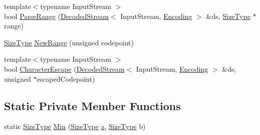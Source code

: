\begin{DoxyCompactItemize}
\item 
{\footnotesize template$<$typename Input\+Stream $>$ }\\bool \mbox{\hyperlink{classrapidjson_1_1internal_1_1_generic_regex_a026d39ed3817f87cb287a6f8fa7fc92b}{Parse\+Range}} (\mbox{\hyperlink{classrapidjson_1_1internal_1_1_decoded_stream}{Decoded\+Stream}}$<$ Input\+Stream, \mbox{\hyperlink{classrapidjson_1_1_encoding}{Encoding}} $>$ \&ds, \mbox{\hyperlink{namespacerapidjson_a44eb33eaa523e36d466b1ced64b85c84}{Size\+Type}} $\ast$range)
\item 
\mbox{\hyperlink{namespacerapidjson_a44eb33eaa523e36d466b1ced64b85c84}{Size\+Type}} \mbox{\hyperlink{classrapidjson_1_1internal_1_1_generic_regex_a94c34701cb0a5620feedd9edc19feb0f}{New\+Range}} (unsigned codepoint)
\item 
{\footnotesize template$<$typename Input\+Stream $>$ }\\bool \mbox{\hyperlink{classrapidjson_1_1internal_1_1_generic_regex_a3c70a25082040233268ad41085a26cf6}{Character\+Escape}} (\mbox{\hyperlink{classrapidjson_1_1internal_1_1_decoded_stream}{Decoded\+Stream}}$<$ Input\+Stream, \mbox{\hyperlink{classrapidjson_1_1_encoding}{Encoding}} $>$ \&ds, unsigned $\ast$escaped\+Codepoint)
\end{DoxyCompactItemize}
\subsection*{Static Private Member Functions}
\begin{DoxyCompactItemize}
\item 
static \mbox{\hyperlink{namespacerapidjson_a44eb33eaa523e36d466b1ced64b85c84}{Size\+Type}} \mbox{\hyperlink{classrapidjson_1_1internal_1_1_generic_regex_a03202b58856e5d43fbb6e8e7546a0bd6}{Min}} (\mbox{\hyperlink{namespacerapidjson_a44eb33eaa523e36d466b1ced64b85c84}{Size\+Type}} \mbox{\hyperlink{namespacerapidjson_a11fce64e721729aaf6be4a485c78f231}{a}}, \mbox{\hyperlink{namespacerapidjson_a44eb33eaa523e36d466b1ced64b85c84}{Size\+Type}} b)
\end{DoxyCompactItemize}
